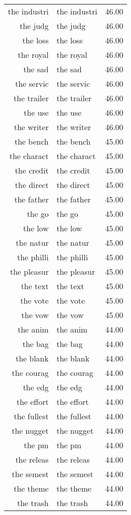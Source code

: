 \begin{table}[ht]
\begin{tabular}{rlr}
  the industri & the industri & 46.00 \\ 
  the judg & the judg & 46.00 \\ 
  the loss & the loss & 46.00 \\ 
  the royal & the royal & 46.00 \\ 
  the sad & the sad & 46.00 \\ 
  the servic & the servic & 46.00 \\ 
  the trailer & the trailer & 46.00 \\ 
  the use & the use & 46.00 \\ 
  the writer & the writer & 46.00 \\ 
  the bench & the bench & 45.00 \\ 
  the charact & the charact & 45.00 \\ 
  the credit & the credit & 45.00 \\ 
  the direct & the direct & 45.00 \\ 
  the father & the father & 45.00 \\ 
  the go & the go & 45.00 \\ 
  the low & the low & 45.00 \\ 
  the natur & the natur & 45.00 \\ 
  the philli & the philli & 45.00 \\ 
  the pleasur & the pleasur & 45.00 \\ 
  the text & the text & 45.00 \\ 
  the vote & the vote & 45.00 \\ 
  the vow & the vow & 45.00 \\ 
  the anim & the anim & 44.00 \\ 
  the bag & the bag & 44.00 \\ 
  the blank & the blank & 44.00 \\ 
  the courag & the courag & 44.00 \\ 
  the edg & the edg & 44.00 \\ 
  the effort & the effort & 44.00 \\ 
  the fullest & the fullest & 44.00 \\ 
  the nugget & the nugget & 44.00 \\ 
  the pm & the pm & 44.00 \\ 
  the releas & the releas & 44.00 \\ 
  the semest & the semest & 44.00 \\ 
  the theme & the theme & 44.00 \\ 
  the trash & the trash & 44.00 \\ 

\end{tabular}
\end{table}
